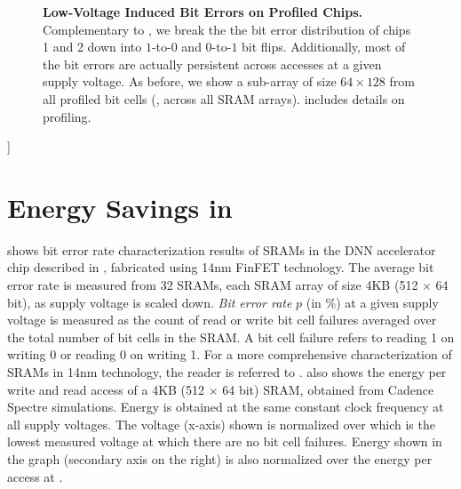 {\begin{figure}[H]
	\vspace*{-6px}
	\caption{\textbf{Low-Voltage Induced Bit Errors on Profiled Chips.} Complementary to , we break the the bit error distribution of chips 1 and 2 down into $1$-to-$0$ and $0$-to-$1$ bit flips. Additionally, most of the bit errors are actually persistent across accesses at a given supply voltage. As before, we show a sub-array of size $64 \times 128$ from all profiled bit cells (\ie, across all SRAM arrays).  includes details on profiling.}
	\label{fig:supp-errors}
	\vspace*{-0.1cm}
\end{figure}}]

\section{Energy Savings in }
\label{sec:supp-introduction}

 shows bit error rate characterization results of SRAMs in the DNN accelerator chip described in \cite{ChandramoorthyHPCA2019}, fabricated using 14nm FinFET technology. The average bit error rate is measured from 32 SRAMs, each SRAM array of size 4KB (512 $\times$ 64 bit), as supply voltage is scaled down. \textit{Bit error rate} $p$ (in \%) at a given supply voltage is measured as the count of read or write bit cell failures averaged over the total number of bit cells in the SRAM. A bit cell failure refers to reading 1 on writing 0 or reading 0 on writing 1.  For a more comprehensive characterization of SRAMs in 14nm technology, the reader is referred to \cite{GanapathyDAC2017}.  also shows the energy per write and read access of a 4KB (512 $\times$ 64 bit) SRAM, obtained from Cadence Spectre simulations. Energy is obtained at the same constant clock frequency at all supply voltages. The voltage (x-axis) shown is normalized over \Vmin which is the lowest measured voltage at which there are no bit cell failures.  Energy shown in the graph (secondary axis on the right) is also normalized over the energy per access at \Vmin.

